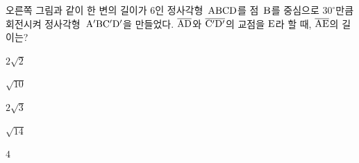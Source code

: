\noindent\begin{minipage}[t]{0.58\linewidth}\vspace{0pt}\raggedright 오른쪽 그림과 같이 한 변의 길이가 $6$인 정사각형~$\mathrm{ABCD}$를 점~$\mathrm{B}$를 중심으로 $30^\circ$만큼 회전시켜 정사각형~$\mathrm{A'BC'D'}$을 만들었다. $\overline{\mathrm{AD}}$와 $\overline{\mathrm{C'D'}}$의 교점을 $\mathrm{E}$라 할 때, $\overline{\mathrm{AE}}$의 길이는?\end{minipage}\hfill\begin{minipage}[t]{0.4\linewidth}\vspace{0pt}\centering \resizebox{\ifdim\width>\linewidth\linewidth\else\width\fi}{!}{}\end{minipage}\par
\begin{choices32}{\rule[-3ex]{0pt}{8ex}$2\sqrt{2}$}{\rule[-3ex]{0pt}{8ex}$\sqrt{10}$}{\rule[-3ex]{0pt}{8ex}$2\sqrt{3}$}{\rule[-3ex]{0pt}{8ex}$\sqrt{14}$}{\rule[-3ex]{0pt}{8ex}$4$}\end{choices32}
